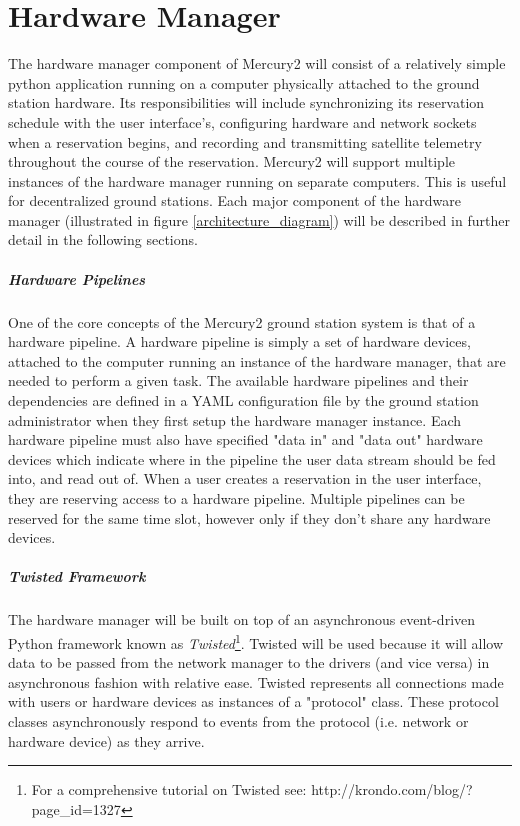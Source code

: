 \documentclass{mxl-design}
\begin{document}
\section{Hardware Manager}
\label{sec:hardware_manager}
The hardware manager component of Mercury2 will consist of a relatively simple python application running on a computer physically attached to the ground station hardware. Its responsibilities will include synchronizing its reservation schedule with the user interface's, configuring hardware and network sockets when a reservation begins, and recording and transmitting satellite telemetry throughout the course of the reservation. Mercury2 will support multiple instances of the hardware manager running on separate computers. This is useful for decentralized ground stations. Each major component of the hardware manager (illustrated in figure \ref{architecture_diagram}) will be described in further detail in the following sections. 

\subparagraph{Hardware Pipelines}
One of the core concepts of the Mercury2 ground station system is that of a hardware pipeline. A hardware pipeline is simply a set of hardware devices, attached to the computer running an instance of the hardware manager, that are needed to perform a given task. The available hardware pipelines and their dependencies are defined in a YAML configuration file by the ground station administrator when they first setup the hardware manager instance. Each hardware pipeline must also have specified "data in" and "data out" hardware devices which indicate where in the pipeline the user data stream should be fed into, and read out of. When a user creates a reservation in the user interface, they are reserving access to a hardware pipeline. Multiple pipelines can be reserved for the same time slot, however only if they don't share any hardware devices.

\subparagraph{Twisted Framework}
The hardware manager will be built on top of an asynchronous event-driven Python framework known as \textit{Twisted}\footnote{For a comprehensive tutorial on Twisted see: http://krondo.com/blog/?page\_id=1327}. Twisted will be used because it will allow data to be passed from the network manager to the drivers (and vice versa) in asynchronous fashion with relative ease. Twisted represents all connections made with users or hardware devices as instances of a "protocol" class. These protocol classes asynchronously respond to events from the protocol (i.e. network or hardware device) as they arrive.
\end{document}
